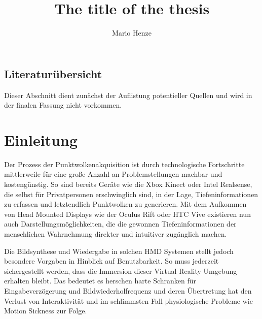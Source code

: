 \documentclass[hyperref, beleg, german]{cgvpub}
\author{Mario Henze}
\title{The title of the thesis}
\begin{document}
\section{Literaturübersicht}

Dieser Abschnitt dient zunächst der Auflistung potentieller Quellen und wird in
der finalen Fassung nicht vorkommen.

\begin{description}
	\item[\cite{discher2018point}]
	\item[\cite{rusinkiewicz2000qsplat}]
	\item[\cite{goswami2010high}]
	\item[\cite{wimmer2006instant}]
	\item[\cite{shum2000review}]
	\item[\cite{mark1997post}]
	\item[\cite{mcmillan1995head}]
	\item[\cite{chang1999ldi}]
	\item[\cite{he1998layered}]
	\item[\cite{mcmillan2009image}]
\end{description}

\chapter{Einleitung}
\label{sec:einleitung}

Der Prozess der Punktwolkenakquisition ist durch technologische Fortschritte
mittlerweile für eine große Anzahl an Problemstellungen machbar und
kostengünstig. So sind bereits Geräte wie die Xbox Kinect oder Intel
Realsense, die selbst für Privatpersonen erschwinglich sind, in der Lage,
Tiefeninformationen zu erfassen und letztendlich Punktwolken zu generieren. Mit
dem Aufkommen von Head Mounted Displays wie der Oculus Rift oder HTC Vive
existieren nun auch Darstellungsmöglichkeiten, die die gewonnen
Tiefeninformationen der menschlichen Wahrnehmung direkter und intuitiver
zugänglich machen.

Die Bildsynthese und Wiedergabe in solchen HMD Systemen stellt jedoch besondere
Vorgaben in Hinblick auf Benutzbarkeit. So muss jederzeit sichergestellt werden,
dass die Immersion dieser Virtual Reality Umgebung erhalten bleibt. Das bedeutet
es herschen harte Schranken für Eingabeverzögerung und Bildwiederholfrequenz und
deren Übertretung hat den Verlust von Interaktivität und im schlimmsten Fall
physiologische Probleme wie Motion Sickness zur Folge.
\end{document}
